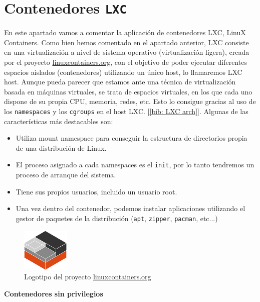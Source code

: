 \documentclass[a4paper, oneside, 12pt]{book}
\begin{document}
	\section{Contenedores \texttt{LXC}}
	\noindent En este apartado vamos a comentar la aplicación de contenedores LXC, LinuX Containers. Como bien hemos comentado en el apartado anterior, LXC consiste en una virtualización a nivel de sistema operativo (virtualización ligera), creada por el proyecto \url{linuxcontainers.org}, con el objetivo de poder ejecutar diferentes espacios aislados (contenedores) utilizando un único host, lo llamaremos LXC host. Aunque pueda parecer que estamos ante una técnica de virtualización basada en máquinas virtuales, se trata de espacios virtuales, en los que cada uno dispone de su propia CPU, memoria, redes, etc. Esto lo consigue gracias al uso de los \texttt{namespaces} y los \texttt{cgroups} en el host LXC. [\ref{bib: LXC arch}]. Algunas de las características más destacables son:
	\begin{itemize}
		\item Utiliza mount namespace para conseguir la estructura de directorios propia de una distribución de Linux.
		\item El proceso asignado a cada namespaces es el \texttt{init}, por lo tanto tendremos un proceso de arranque del sistema.
		\item Tiene sus propios usuarios, incluido un usuario root.
		\item Una vez dentro del contenedor, podemos instalar aplicaciones utilizando el gestor de paquetes de la distribución (\texttt{apt}, \texttt{zipper}, \texttt{pacman}, etc...)
	\end{itemize}

	\begin{figure}[h]
		\begin{center}
			\includegraphics[width=0.2\textwidth]{img/lxc_logo.png}
			\caption{Logotipo del proyecto \url{linuxcontainers.org}}
			\label{img: LXC}
		\end{center}
	\end{figure}

	\noindent \textbf{\large Contenedores sin privilegios}\\
\end{document}
